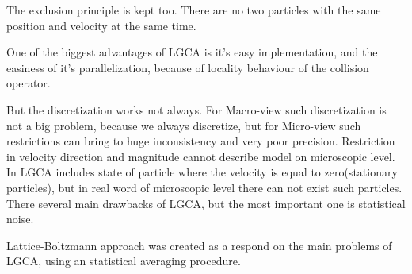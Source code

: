 The exclusion principle is kept too. There are no two particles with the same position and velocity at the same time.

One of the biggest advantages of LGCA is it's easy implementation, and  the easiness of it's parallelization, because of locality behaviour of the collision operator.

But the discretization works not always. For Macro-view such discretization is not a big problem, because we always discretize, but for Micro-view such restrictions can bring to huge inconsistency and very poor precision. Restriction in velocity direction and magnitude cannot describe model on microscopic level. In LGCA includes state of particle where the velocity is equal to zero(stationary particles), but in real word of microscopic level there can not exist such particles. There several main drawbacks of LGCA, but the most important one is statistical noise.

Lattice-Boltzmann approach was created as a respond on the main problems of LGCA, using an statistical averaging procedure.
